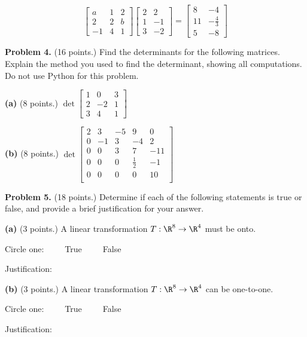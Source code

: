 \documentclass[12pt]{article}
\begin{document}
\[
\left[\begin{matrix}a & 1 & 2\\2 & 2 & b\\-1 & 4 & 1\end{matrix}\right]
\left[\begin{matrix}2 & 2\\1 & -1\\3 & -2\end{matrix}\right]=
\left[\begin{matrix}8 & -4\\11 & - \frac{4}{3}\\5 & -8\end{matrix}\right]
\] 

\clearpage

\textbf{Problem 4.} (16 points.) Find the determinants for the following matrices. Explain the method you used to find the determinant, showing all computations. Do not use Python for this problem.

\textbf{(a)} (8 points.)
$
\det\begin{bmatrix}1&0&3\\2&-2&1\\3&4&1\end{bmatrix}
$

\vskip4in

\textbf{(b)} (8 points.)
$
\det\begin{bmatrix}
2&3&-5&9&0\\
0&-1&3&-4&2\\
0&0&3&7&-11\\
0&0&0&\frac{1}{2}&-1\\
0&0&0&0&10\\
\end{bmatrix} 
$
\clearpage

\textbf{Problem 5.} (18 points.) Determine if each of the following statements is true or false, and provide a brief justification for your answer.

\textbf{(a)} (3 points.) A linear transformation $T:\R^8\to\R^4$ must be onto.

Circle one:\ \ \ \ \  True\ \ \ \ \ False

Justification:

\vskip1.5in


\textbf{(b)} (3 points.) A linear transformation $T:\R^8\to\R^4$ can be one-to-one.

Circle one:\ \ \ \ \  True\ \ \ \ \ False

Justification:
\end{document}
